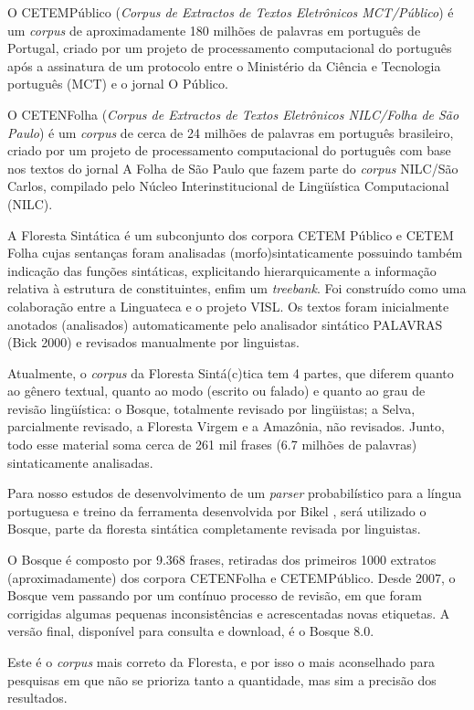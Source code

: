 O CETEMPúblico (\emph{Corpus de Extractos de Textos Eletrônicos MCT/Público}) é um \emph{corpus} de aproximadamente 180 milhões de palavras em português de Portugal, criado por um projeto de processamento computacional do português após a assinatura de um protocolo entre o Ministério da Ciência e Tecnologia português (MCT) e o jornal O Público.

O CETENFolha (\emph{Corpus de Extractos de Textos Eletrônicos NILC/Folha de São Paulo}) é um \emph{corpus} de cerca de 24 milhões de palavras em português brasileiro, criado por um projeto de processamento computacional do português com base nos textos do jornal A Folha de São Paulo que fazem parte do \emph{corpus} NILC/São Carlos, compilado pelo Núcleo Interinstitucional de Lingüística Computacional (NILC).

A Floresta Sintática é um subconjunto dos corpora CETEM Público e CETEM Folha cujas sentanças foram analisadas (morfo)sintaticamente possuindo também indicação das funções sintáticas, explicitando hierarquicamente a informação relativa à estrutura de constituintes, enfim um \emph{treebank}. Foi construído como uma colaboração entre a Linguateca e o projeto VISL. Os textos foram inicialmente anotados (analisados) automaticamente pelo analisador sintático PALAVRAS (Bick 2000) e revisados manualmente por linguistas.

Atualmente, o \emph{corpus} da Floresta Sintá(c)tica tem 4 partes, que diferem quanto ao gênero textual, quanto ao modo (escrito ou falado) e quanto ao grau de revisão lingüística: o Bosque, totalmente revisado por lingüistas; a Selva, parcialmente revisado, a Floresta Virgem e a Amazônia, não revisados. Junto, todo esse material soma cerca de 261 mil frases (6.7 milhões de palavras) sintaticamente analisadas.

Para nosso estudos de desenvolvimento de um \emph{parser} probabilístico para a língua portuguesa e treino da ferramenta desenvolvida por Bikel , será utilizado o Bosque, parte da floresta sintática completamente revisada por linguistas.

O Bosque é composto por 9.368 frases, retiradas dos primeiros 1000 extratos (aproximadamente) dos corpora CETENFolha e CETEMPúblico. Desde 2007, o Bosque vem passando por um contínuo processo de revisão, em que foram corrigidas algumas pequenas inconsistências e acrescentadas novas etiquetas. A versão final, disponível para consulta e download, é o Bosque 8.0.

Este é o \emph{corpus} mais correto da Floresta, e por isso o mais aconselhado para pesquisas em que não se prioriza tanto a quantidade, mas sim a precisão dos resultados.

